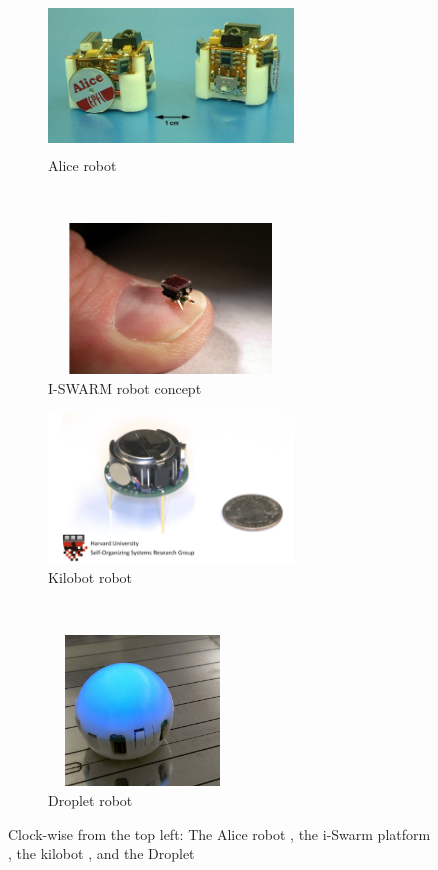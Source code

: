 \documentclass[Main.tex]{subfiles}
\begin{document}
\begin{figure}[!ht]
\centering\begin{subfigure}{.5\textwidth}
\centering\includegraphics[height=4cm,width=6.5cm]{assets/alicerobot.png}
\caption{Alice robot}
\end{subfigure}~
\centering\begin{subfigure}{.5\textwidth}
\centering\includegraphics[height=4cm,width=6.5cm]{assets/iswarm.png}
\caption{I-SWARM robot concept}
\end{subfigure}\vspace{1cm}
\centering\begin{subfigure}{.5\textwidth}
\centering\includegraphics[height=4cm,width=6.5cm]{assets/kilobotrobot.png}
\caption{Kilobot robot}
\end{subfigure}~
\centering\begin{subfigure}{.5\textwidth}
\centering\includegraphics[height=4cm,width=5cm]{assets/dropletrobot.png}
\caption{Droplet robot}
\end{subfigure}
\caption{Clock-wise from the top left: The Alice robot \citep{caprari2005mobile}\label{fig:swarmbots}, the i-Swarm platform \citep{Seyfried2005}, the kilobot \citep{Rubenstein2012}, and the Droplet \cite{farrow14}}
\end{figure}
\end{document}
